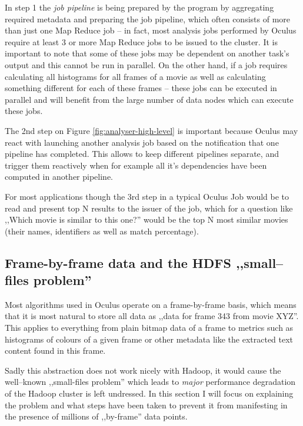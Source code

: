 In step 1 the \textit{job pipeline} is being prepared by the program by aggregating required metadata and preparing the job pipeline, which often consists of more than just one Map Reduce job -- in fact, most analysis jobs performed by Oculus require at least 3 or more Map Reduce jobs to be issued to the cluster. It is important to note that some of these jobs may be dependent on another task's output and this cannot be run in parallel. On the other hand, if a job requires calculating all histograms for all frames of a movie as well as calculating something different for each of these frames -- these jobs can be executed in parallel and will benefit from the large number of data nodes which can execute these jobs.

The 2nd step on Figure \ref{fig:analyser-high-level} is important because Oculus may react with launching another analysis job based on the notification that one pipeline has completed. This allows to keep different pipelines separate, and trigger them reactively when for example all it's dependencies have been computed in another pipeline.

For most applications though the 3rd step in a typical Oculus Job would be to read and present top N results to the issuer of the job, which for a question like ,,Which movie is similar to this one?'' would be the top N most similar movies (their names, identifiers as well as match percentage).

\subsection{Frame-by-frame data and the HDFS ,,small--files problem''}
\label{sec:sequence-files}
Most algorithms used in Oculus operate on a frame-by-frame basis, which means that it is most natural to store all data as ,,data for frame 343 from movie XYZ''.
This applies to everything from plain bitmap data of a frame to metrics such as histograms of colours of a given frame or other metadata like the extracted text content found in this frame.

Sadly this abstraction does not work nicely with Hadoop, it would cause the well--known ,,small-files problem'' which leads to \textit{major} performance degradation of the Hadoop cluster is left undressed. In this section I will focus on explaining the problem and what steps have been taken to prevent it from manifesting in the presence of millions of ,,by-frame'' data points.

